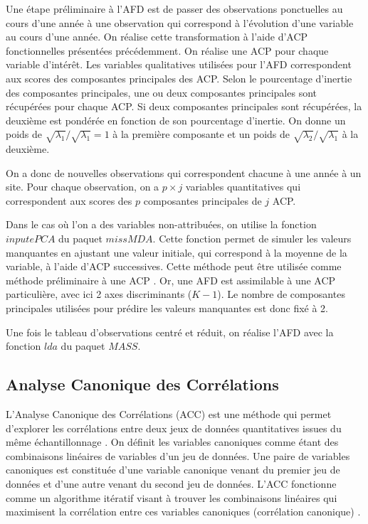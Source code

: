\documentclass[12pt]{article}
\begin{document}
Une étape préliminaire à l’AFD est de passer des observations ponctuelles au cours d’une année à une observation qui correspond à l’évolution d’une variable au cours d’une année. On réalise cette transformation à l’aide d’ACP fonctionnelles présentées précédemment. On réalise une ACP pour chaque variable d’intérêt. Les variables qualitatives utilisées pour l’AFD correspondent aux scores des composantes principales des ACP. Selon le pourcentage d’inertie des composantes principales, une ou deux composantes principales sont récupérées pour chaque ACP. Si deux composantes principales sont récupérées, la deuxième est pondérée en fonction de son pourcentage d’inertie. On donne un poids de $\sqrt{\lambda_1}/\sqrt{\lambda_1}=1$ à la première composante et un poids de $\sqrt{\lambda_2}/\sqrt{\lambda_1}$ à la deuxième. 

On a donc de nouvelles observations qui correspondent chacune à une année à un site. Pour chaque observation, on a $p \times j$ variables quantitatives qui correspondent aux scores des $p$ composantes principales de $j$ ACP. 

Dans le cas où l’on a des variables non-attribuées, on utilise la fonction $inputePCA$ du paquet $missMDA$. Cette fonction permet de simuler les valeurs manquantes en ajustant une valeur initiale, qui correspond à la moyenne de la variable, à l’aide d’ACP successives. Cette méthode peut être utilisée comme méthode préliminaire à une ACP \citep{Husson2012}. Or, une AFD est assimilable à une ACP particulière, avec ici 2 axes discriminants ($K-1$). Le nombre de composantes principales utilisées pour prédire les valeurs manquantes est donc fixé à 2. 

Une fois le tableau d’observations centré et réduit, on réalise l’AFD avec la fonction $lda$ du paquet $MASS$.

\subsection{Analyse Canonique des Corrélations}

L’Analyse Canonique des Corrélations (ACC) est une méthode qui permet d’explorer les corrélations entre deux jeux de données quantitatives issues du même échantillonnage \citep{Gonzalez2008}. On définit les variables canoniques comme étant des combinaisons linéaires de variables d’un jeu de données. Une paire de variables canoniques est constituée d’une variable canonique venant du premier jeu de données et d’une autre venant du second jeu de données. L'ACC fonctionne comme un algorithme itératif visant à trouver les combinaisons linéaires qui maximisent la corrélation entre ces variables canoniques (corrélation canonique) \citep{Gonzalez2008}. 
\end{document}
